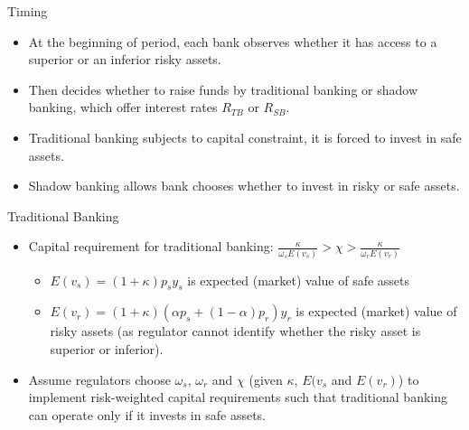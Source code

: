 \documentclass[
  ignorenonframetext,
]{beamer}
\providecommand{\tightlist}{%
  \setlength{\itemsep}{0pt}\setlength{\parskip}{0pt}}
\begin{document}
\begin{frame}{Timing}
\protect\hypertarget{timing}{}

\begin{itemize}
\item
  At the beginning of period, each bank observes whether it has access
  to a superior or an inferior risky assets.
\item
  Then decides whether to raise funds by traditional banking or shadow
  banking, which offer interest rates \(R_{TB}\) or \(R_{SB}\).
\item
  Traditional banking subjects to capital constraint, it is forced to
  invest in safe assets.
\item
  Shadow banking allows bank chooses whether to invest in risky or safe
  assets.
\end{itemize}

\end{frame}

\begin{frame}{Traditional Banking}
\protect\hypertarget{traditional-banking}{}

\begin{itemize}
\tightlist
\item
  Capital requirement for traditional banking:
  \(\frac{\kappa}{\omega_{s}E(v_{s})}>\chi>\frac{\kappa}{\omega_{r}E(v_{r})}\)

  \begin{itemize}
  \tightlist
  \item
    \(E(v_{s})=(1+\kappa)p_{s}y_{s}\) is expected (market) value of safe
    assets
  \item
    \(E(v_{r})=(1+\kappa)(\alpha p_{s}+(1-\alpha)p_{r})y_{r}\) is
    expected (market) value of risky assets (as regulator cannot
    identify whether the risky asset is superior or inferior).
  \end{itemize}
\item
  Assume regulators choose \(\omega_{s}\), \(\omega_{r}\) and \(\chi\)
  (given \(\kappa\), \(E(v_{s}\) and \(E(v_{r})\)) to implement
  risk-weighted capital requirements such that traditional banking can
  operate only if it invests in safe assets.
\end{itemize}

\end{frame}
\end{document}
